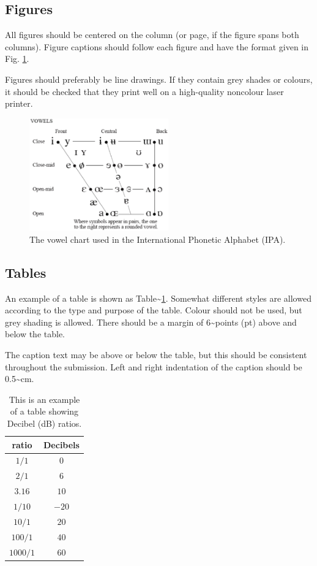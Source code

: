 \documentclass[
  a4paper,
  11pt,
  twocolumn]{article}
\begin{document}
\subsection{Figures}

All figures should be centered on the column (or page, if the figure
spans both columns). Figure captions should follow each figure and have
the format given in Fig. \ref{fig:vowels}.

Figures should preferably be line drawings. If they contain grey shades
or colours, it should be checked that they print well on a high-quality
noncolour laser printer.

\begin{figure}[!ht]
\begin{center}
\includegraphics[width=6cm]{./includes/figures/ipa.eps}
\caption{The vowel chart used in the International Phonetic
Alphabet (IPA).}\label{fig:vowels}
\end{center}
\end{figure}

\subsection{Tables}

An example of a table is shown as
Table\textasciitilde{}\ref{tab:decibel}. Somewhat different styles are
allowed according to the type and purpose of the table. Colour should
not be used, but grey shading is allowed. There should be a margin of
6\textasciitilde points (pt) above and below the table.

The caption text may be above or below the table, but this should be
consistent throughout the submission. Left and right indentation of the
caption should be 0.5\textasciitilde cm.

\begin{table}[!ht]
  \begin{center}
  \begin{tabular}{|c|c|}
  \hline
  \rowcolor[gray]{.75}
  ratio    & Decibels\\
  \hline
  $1/1$    & $0$\\
  $2/1$    & $6$\\
  $3.16$   & $10$\\
  $1/10$   & $-20$\\
  $10/1$   & $20$\\
  $100/1$  & $40$\\
  $1000/1$ & $60$\\
  \hline
  \end{tabular}
  \caption{This is an example of a table showing Decibel (dB)
  ratios.}\label{tab:decibel}
  \end{center}
\end{table}
\end{document}
